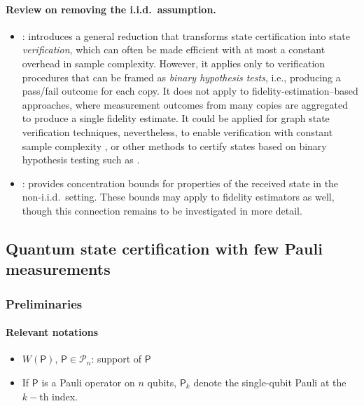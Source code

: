 \documentclass[11pt]{article}
\renewcommand{\P}{\mathsf{P}}
\newcommand{\Pauli}{\mathcal{P}}
\begin{document}
\paragraph{Review on removing the i.i.d.\ assumption.}
\begin{itemize}
    \item \cite{ZH19efficient}: introduces a general reduction that transforms state certification into state \emph{verification}, which can often be made efficient with at most a constant overhead in sample complexity. However, it applies only to verification procedures that can be framed as \emph{binary hypothesis tests}, i.e., producing a pass/fail outcome for each copy. It does not apply to fidelity-estimation--based approaches, where measurement outcomes from many copies are aggregated to produce a single fidelity estimate. It could be applied for graph state verification techniques, nevertheless, to enable verification with constant sample complexity \cite{LZH23robust}, or other methods to certify states based on binary hypothesis testing such as \cite{LZ25universal}.
    \item \cite{FKMO24learning}: provides concentration bounds for properties of the received state in the non-i.i.d.\ setting. These bounds may apply to fidelity estimators as well, though this connection remains to be investigated in more detail.
\end{itemize}

\subsection{Quantum state certification with few Pauli measurements}
\subsubsection{Preliminaries}
\paragraph{Relevant notations}
\begin{itemize}
    \item $W(\P)$, $\P\in\Pauli_n$: support of $\P$
    \item If $\P$ is a Pauli operator on $n$ qubits, $\P_k$ denote the single-qubit Pauli at the $k-$th index.
\end{itemize}
\end{document}
